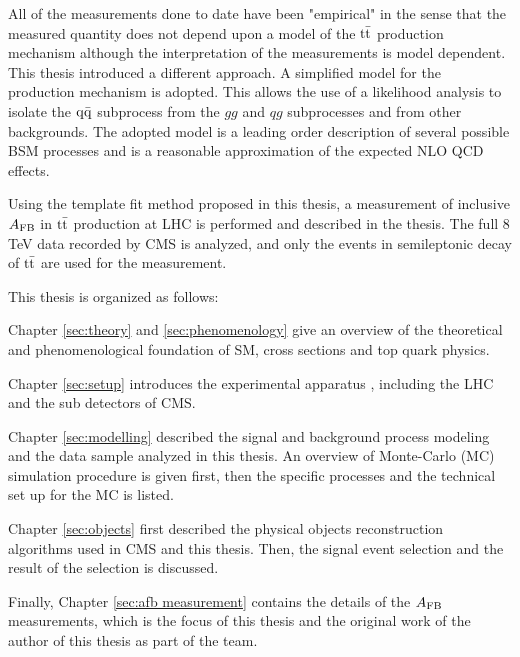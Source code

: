 All of the measurements done to date have been "empirical" in the sense that the measured quantity does not depend upon a model of the $\mathrm{t}\bar{\mathrm{t}}$ production mechanism although the interpretation of the measurements is model dependent. This thesis introduced a different approach. A simplified model for the production mechanism is adopted. This allows the use of a likelihood analysis to isolate the $\mathrm{q \bar{q}}$ subprocess from the $gg$  and $qg$ subprocesses and from other backgrounds.  The adopted model is a leading order description of several possible BSM processes and is a reasonable approximation of the expected NLO QCD effects.

Using the template fit method proposed in this thesis, a measurement of inclusive $A_{\mathrm{FB}}$ in $\mathrm{t}\bar{\mathrm{t}}$ production at LHC is performed and described in the thesis. The full 8 TeV data recorded by CMS is analyzed, and only the events in semileptonic decay of $\mathrm{t}\bar{\mathrm{t}}$ are used for the measurement. 
 


This thesis is organized as follows:

Chapter \ref{sec:theory} and \ref{sec:phenomenology} give an overview of the theoretical and phenomenological foundation of SM, cross sections and top quark physics.

Chapter \ref{sec:setup} introduces the experimental apparatus , including the LHC and the sub detectors of CMS. 

Chapter \ref{sec:modelling} described the signal and background process modeling and the data sample analyzed in this thesis. An overview of Monte-Carlo (MC) simulation procedure is given first, then the specific processes and the technical set up for the MC is listed. 

Chapter \ref{sec:objects} first described the physical objects reconstruction algorithms used in CMS and this thesis. Then, the signal event selection and the result of the selection is discussed.

Finally, Chapter \ref{sec:afb measurement} contains the details of the $A_{\mathrm{FB}}$ measurements, which is the focus of this thesis and the original work of the author of this thesis as part of the team.